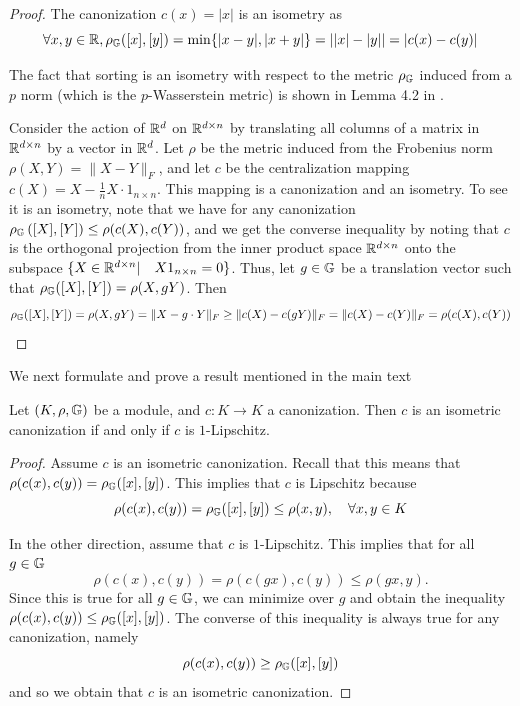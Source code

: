 \isometries*
\label{Proof_isometries}
\begin{proof}
The  canonization $c(x)=|x|$ is an isometry as
$$\forall x,y \in \mathbb{R}, \rho_{\mathbb{G}}([x],[y]) = \min\{|x-y|,|x+y|\} = ||x|-|y|| = |c(x)-c(y)|$$

The fact that sorting is an isometry with respect to the metric $\rho_{\mathbb{G}}$ induced from a $p$ norm (which is the $p$-Wasserstein metric) is shown in
 Lemma 4.2 in  \cite{sortLemma}.

Consider the action of $\mathbb{R}^d$ on $\mathbb{R}^{d\times n}$ by translating all columns of a matrix in $\mathbb{R}^{d\times n}$ by a vector in $\mathbb{R}^d$. Let $\rho$ be the metric induced from the Frobenius norm $\rho(X,Y)=\|X-Y\|_F $, and let $c$ be the centralization mapping $c(X)=X-\frac{1}{n}X\cdot 1_{n\times n}$. This mapping is a canonization and an isometry. To see it is an isometry, note that we have for any canonization $\rho_{\mathbb{G}}\left([X],[Y]\right) \leq \rho(c(X),c(Y))$, and we get the converse inequality by noting that $c$ is the orthogonal projection from the inner product space $\mathbb{R}^{d\times n} $ onto the subspace $\{X\in \mathbb{R}^{d\times n}| \quad X1_{n\times n}=0 \} $. Thus, let $g\in \mathbb{G}$ be a translation vector such that $\rho_{\mathbb{G}}([X],[Y])=\rho(X,gY) $. Then
$$\rho_{\mathbb{G}}([X],[Y])=\rho(X,gY)=\|X-g\cdot Y\|_F\geq \|c(X)-c(gY)\|_F=\|c(X)-c(Y)\|_F=\rho(c(X),c(Y)) $$

\end{proof}

We next formulate and prove a result mentioned in the main text
\begin{proposition}\label{prop:isometryLip}
Let $(K,\rho,\mathbb{G}) $ be a module, and $c:K\to K$ a canonization. Then $c $ is an isometric canonization if and only if $c$ is $1$-Lipschitz.
\end{proposition}
\begin{proof}
Assume $c$ is an isometric canonization. Recall that this means that $\rho(c(x),c(y))=\rho_{\mathbb{G}}([x],[y]) $. This implies that $c$ is Lipschitz because
$$\rho(c(x),c(y))=\rho_{\mathbb{G}}([x],[y])\leq \rho(x,y), \quad \forall x,y\in K  $$

In the other direction, assume that $c$ is $1$-Lipschitz. This implies that for all $g\in \mathbb{G}$
$$\rho(c(x),c(y))=\rho(c(gx),c(y))\leq \rho(gx,y) . $$
Since this is true for all $g\in \mathbb{G}$, we can minimize over $g$ and obtain the inequality $\rho(c(x),c(y))\leq \rho_{\mathbb{G}}([x],[y])$. The converse of this inequality is always true for any canonization, namely
$$\rho(c(x),c(y))\geq \rho_{\mathbb{G}}([x],[y]) $$
and so we obtain that $c$ is an isometric canonization.
\end{proof}


